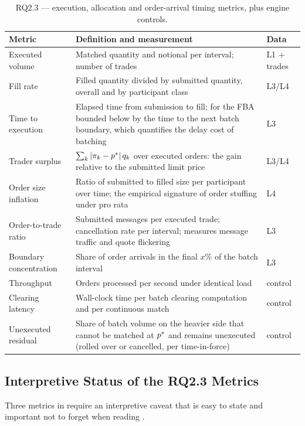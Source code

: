 \begin{table}[htbp]
\centering
\caption[Metrics for RQ2.3]{RQ2.3 --- execution, allocation and
order-arrival timing metrics, plus engine controls.}
\label{tab:metrics3}
\small
\begin{tabularx}{\textwidth}{@{}p{3.1cm} L p{1.6cm}@{}}
\toprule
\textbf{Metric} & \textbf{Definition and measurement} & \textbf{Data}\\
\midrule
Executed volume & Matched quantity and notional per interval; number of
trades & L1 + trades\\
Fill rate & Filled quantity divided by submitted quantity, overall and
by participant class & L3/L4\\
Time to execution & Elapsed time from submission to fill; for the FBA
bounded below by the time to the next batch boundary, which quantifies
the delay cost of batching & L3\\
Trader surplus & $\sum_k |\pi_k - p^{\ast}|\, q_k$ over executed orders: the
gain relative to the submitted limit price & L3/L4\\
Order size inflation & Ratio of submitted to filled size per participant
over time; the empirical signature of order stuffing under pro rata &
L4\\
Order-to-trade ratio & Submitted messages per executed trade;
cancellation rate per interval; measures message traffic and quote
flickering & L3\\
Boundary concentration & Share of order arrivals in the final $x\%$ of
the batch interval & L3\\
Throughput & Orders processed per second under identical load &
control\\
Clearing latency & Wall-clock time per batch clearing computation and
per continuous match & control\\
Unexecuted residual & Share of batch volume on the heavier side that
cannot be matched at $p^{\ast}$ and remains unexecuted (rolled over or
cancelled, per time-in-force) & control\\
\bottomrule
\end{tabularx}
\end{table}

\subsection{Interpretive Status of the RQ2.3 Metrics}
\label{sec:testable}

Three metrics in  require an interpretive caveat that
is easy to state and important not to forget when reading
.


